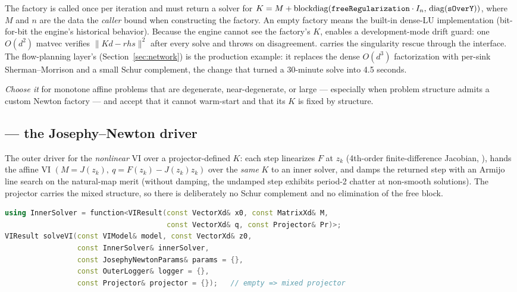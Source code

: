 The factory is called once per iteration and must return a solver for
$K = M + \mathrm{blockdiag}(\texttt{freeRegularization} \cdot I_n,\,
\mathrm{diag}(\texttt{sOverY}))$, where $M$ and $n$ are the data the
\emph{caller} bound when constructing the factory. An empty factory means
the built-in dense-LU implementation (bit-for-bit the engine's historical
behavior). Because the engine cannot see the factory's $K$,
 enables a development-mode drift guard: one
$O(d^2)$ matvec verifies $\|Kd - \mathit{rhs}\|^2$ after every solve and
throws on disagreement.  carries the singularity
rescue through the interface. The flow-planning layer's
 (Section~\ref{sec:network}) is the production
example: it replaces the dense $O(d^3)$ factorization with per-sink
Sherman--Morrison and a small Schur complement, the change that turned a
30-minute solve into 4.5 seconds.

\emph{Choose it} for monotone affine problems that are degenerate,
near-degenerate, or large --- especially when problem structure admits a
custom Newton factory --- and accept that it cannot warm-start and that its
$K$ is fixed by structure.

\subsection{ --- the Josephy--Newton driver}
\label{sec:jn}

The outer driver for the \emph{nonlinear} VI over a projector-defined $K$:
each step linearizes $F$ at $z_k$ (4th-order finite-difference Jacobian,
), hands the affine VI $(M = J(z_k),\
q = F(z_k) - J(z_k) z_k)$ over the \emph{same} $K$ to an inner solver, and
damps the returned step with an Armijo line search on the natural-map merit
(without damping, the undamped step exhibits period-2 chatter at non-smooth
solutions). The projector carries the mixed structure, so there is
deliberately no Schur complement and no elimination of the free block.

\begin{lstlisting}[language=C++]
using InnerSolver = function<VIResult(const VectorXd& x0, const MatrixXd& M,
                                      const VectorXd& q, const Projector& Pr)>;
VIResult solveVI(const VIModel& model, const VectorXd& z0,
                 const InnerSolver& innerSolver,
                 const JosephyNewtonParams& params = {},
                 const OuterLogger& logger = {},
                 const Projector& projector = {});   // empty => mixed projector
\end{lstlisting}

